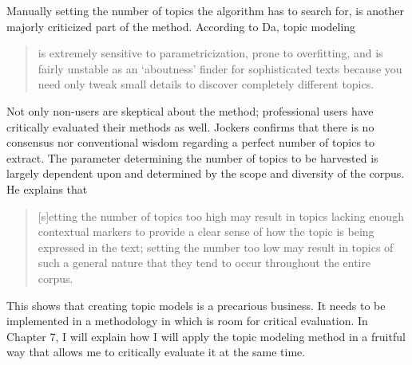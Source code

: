Manually setting the number of topics the algorithm has to search for, is another majorly criticized part of the method. According to Da, topic modeling
\begin{quote}
	is extremely sensitive to parametricization, prone to overfitting, and is fairly unstable as an \enquote*{aboutness} finder for sophisticated texts because you need only tweak small details to discover completely different topics.\autocite[625]{da_computational_2019}
\end{quote}
Not only non-users are skeptical about the method; professional users have critically evaluated their methods as well. Jockers confirms that there is no consensus nor conventional wisdom regarding a perfect number of topics to extract. The parameter determining the number of topics to be harvested is largely dependent upon and determined by the scope and diversity of the corpus. He explains that
\begin{quote}
	[s]etting the number of topics too high may result in topics lacking enough contextual markers to provide a clear sense of how the topic is being expressed in the text; setting the number too low may result in topics of such a general nature that they tend to occur throughout the entire corpus.\autocite[128]{jockers_macroanalysis_2013}
\end{quote}
This shows that creating topic models is a precarious business. It needs to be implemented in a methodology in which is room for critical evaluation. In Chapter 7, I will explain how I will apply the topic modeling method in a fruitful way that allows me to critically evaluate it at the same time.